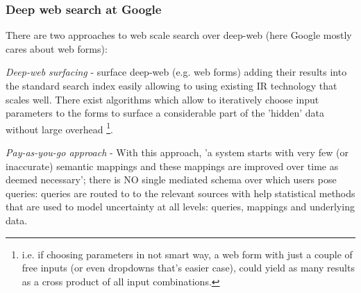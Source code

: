 \subsubsection*{Deep web search at Google}

There are two approaches to web scale search over deep-web (here Google mostly cares about web forms):  

\textit{Deep-web surfacing} - surface deep-web (e.g. web forms) adding their results into the standard search index  easily allowing to using existing IR technology that scales well. There exist algorithms which allow to iteratively choose input parameters to the forms to surface a considerable part of the 'hidden' data without large overhead%
	\footnote{i.e. if choosing parameters in not smart way, a web form with just a couple of free inputs (or even dropdowns that's easier case), could yield as many results as a cross product of all input combinations.}.

\textit{Pay-as-you-go approach}\cite{webscale_paygo} - With this approach, 'a system starts with
very few (or inaccurate) semantic mappings and these mappings are improved over time as deemed necessary';
there is NO single mediated schema over which users pose queries: queries are routed to to the relevant sources with help statistical methods that are used to model uncertainty at all levels: queries, mappings and underlying data. 








